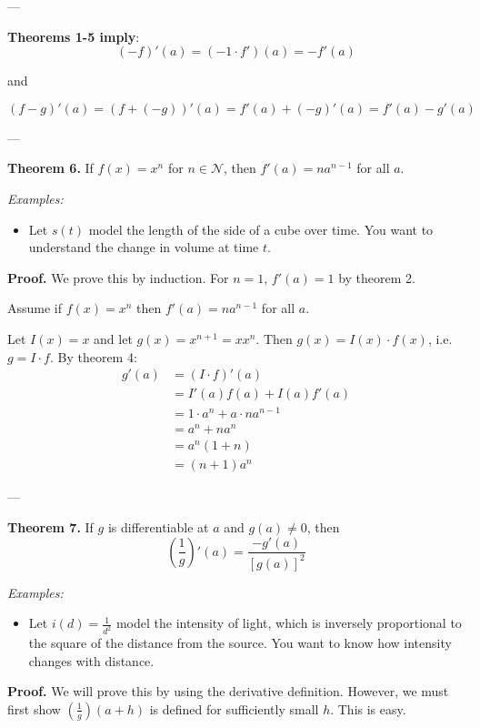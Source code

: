 ---\vs

\textbf{Theorems 1-5 imply}:
\[(-f)'(a)=(-1\cdot f')(a)=-f'(a)\]
\begin{center}and\end{center}
\[(f-g)'(a)=(f+(-g))'(a)=f'(a)+(-g)'(a)=f'(a)-g'(a)\]

---\vs

\textbf{Theorem 6.} If $f(x)=x^n$ for $n\in\mathcal{N}$, then $f'(a)=na^{n-1}$ for
all $a$.

\vs

\textit{Examples:}
\begin{itemize}
\item Let $s(t)$ model the length of the side of a cube over time. You
  want to understand the change in volume at time $t$.
\end{itemize}

\textbf{Proof.} We prove this by induction. For $n=1$, $f'(a)=1$ by
theorem 2.

\vs

Assume if $f(x)=x^n$ then $f'(a)=na^{n-1}$ for all $a$.

\vs

Let $I(x)=x$ and let $g(x)=x^{n+1}=xx^n$. Then $g(x)=I(x)\cdot f(x)$, i.e.
$g=I\cdot f$. By theorem 4:
\begin{align*}
  g'(a)&=(I\cdot f)'(a)\\
       &=I'(a)f(a)+I(a)f'(a)\\
       &=1\cdot a^n+a\cdot na^{n-1}\\
       &=a^n+na^n\\
       &=a^n(1+n)\\
       &=(n+1)a^n
\end{align*}

---\vs

\textbf{Theorem 7.} If $g$ is differentiable at $a$ and $g(a)\neq0$, then
\[\left(\frac{1}{g}\right)'(a)=\frac{-g'(a)}{{[g(a)]}^2}\]

\textit{Examples:}
\begin{itemize}
\item Let $i(d)=\frac{1}{d^2}$ model the intensity of light, which
  is inversely proportional to the square of the distance from the
  source. You want to know how intensity changes with distance.
\end{itemize}

\textbf{Proof.} We will prove this by using the derivative definition.
However, we must first show $\left(\frac{1}{g}\right)(a+h)$ is defined
for sufficiently small $h$. This is easy.

